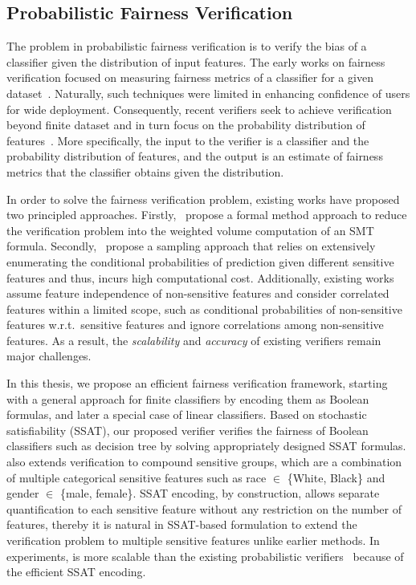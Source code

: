 \subsection*{Probabilistic Fairness Verification} The problem in probabilistic fairness verification is to verify the bias of a classifier given the distribution of input features. The early works on fairness verification focused on measuring fairness metrics of a classifier for a given dataset~\cite{aif360-oct-2018}. Naturally, such techniques were limited in enhancing confidence of users for wide deployment. Consequently, recent verifiers seek to achieve verification beyond  finite dataset and in turn focus on the  probability distribution of features~\cite{albarghouthi2017fairsquare, bastani2019probabilistic}.  More specifically, the input to the verifier is a classifier and  the probability distribution of features, and the output is an estimate of fairness metrics that the classifier obtains given the distribution.


In order to solve the fairness verification problem, existing works have proposed two principled approaches.	Firstly,~\cite{albarghouthi2017fairsquare} propose a formal method approach to reduce the verification problem into the weighted volume computation of an SMT formula. Secondly,~\cite{bastani2019probabilistic} propose a sampling approach that relies on extensively enumerating the conditional probabilities of prediction given different sensitive features and thus, incurs high computational cost. Additionally, existing works assume feature independence of non-sensitive features and consider correlated features within a limited scope, such as conditional probabilities of non-sensitive features w.r.t.\ sensitive features and ignore correlations among non-sensitive features. As a result, the \textit{scalability} and \textit{accuracy} of existing  verifiers remain major challenges.


In this thesis, we propose an efficient fairness verification framework, starting with a general approach for finite classifiers by encoding them as Boolean formulas, and later a special case of linear classifiers. Based on stochastic satisfiability (SSAT)\cite{littman2001stochastic}, our proposed verifier {\justicia} verifies the fairness of Boolean classifiers such as decision tree by solving appropriately designed SSAT formulas. {\justicia} also extends verification to compound sensitive groups, which are a combination of multiple categorical sensitive features such as race $ \in $ \{White, Black\} and gender $ \in $ \{male, female\}. SSAT encoding, by construction, allows separate quantification to each sensitive feature without any restriction on the number of features, thereby it is natural in SSAT-based formulation to extend the verification problem to multiple sensitive features unlike earlier methods. In experiments, {\justicia} is more scalable than the existing probabilistic verifiers~\cite{albarghouthi2017fairsquare,bastani2019probabilistic} because of the efficient SSAT encoding.


